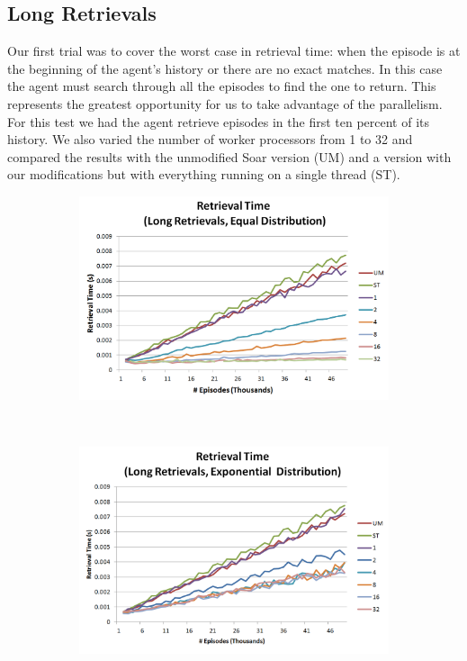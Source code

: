 \documentclass[11pt]{article} %
\begin{document}
\subsection{Long Retrievals}
Our first trial was to cover the worst case in retrieval time: when the episode is at the beginning of the agent's history or there are no exact matches. In this case the agent must search through all the episodes to find the one to return. This represents the greatest opportunity for us to take advantage of the parallelism. For this test we had the agent retrieve episodes in the first ten percent of its history. We also varied the number of worker processors from 1 to 32 and compared the results with the unmodified Soar version (UM) and a version with our modifications but with everything running on a single thread (ST). 

\begin{figure}
        \centering
        \begin{subfigure}[b]{0.55\textwidth}
                \centering
                \includegraphics[width=\textwidth]{images/ret_worst_eq}
                \label{fig:retleq}
        \end{subfigure}%
        ~ %
        \begin{subfigure}[b]{0.55\textwidth}
                \centering
                \includegraphics[width=\textwidth]{images/ret_long_exp}

\end{subfigure}
\end{figure}
\end{document}
